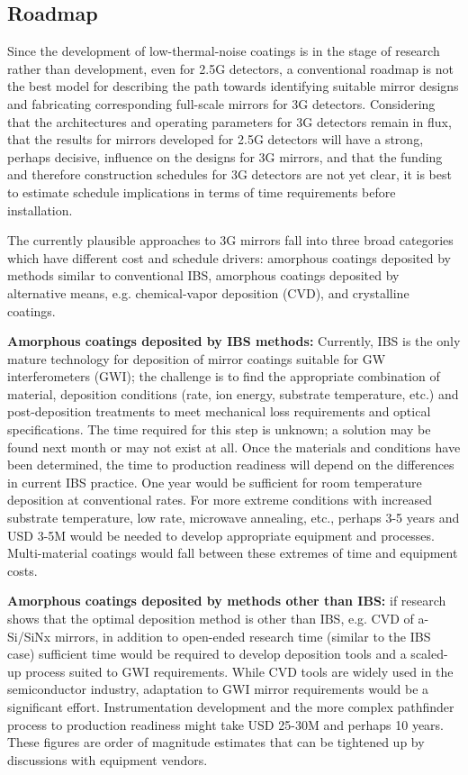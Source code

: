 \subsection{Roadmap}
Since the development of low-thermal-noise coatings is in the stage of research rather than development, even for \ac{2.5G} detectors, a conventional roadmap is not the best model for describing the path towards identifying suitable mirror designs and fabricating corresponding full-scale mirrors for \ac{3G} detectors. Considering that the architectures and operating parameters for \ac{3G} detectors remain in flux, that the results for mirrors developed for \ac{2.5G} detectors will have a strong, perhaps decisive, influence on the designs for \ac{3G} mirrors, and that the funding and therefore construction schedules for \ac{3G} detectors are not yet clear, it is best to estimate schedule implications in terms of time requirements before installation. 

The currently plausible approaches to \ac{3G} mirrors fall into three broad categories which have different cost and schedule drivers: amorphous coatings deposited by methods similar to conventional IBS, amorphous coatings deposited by alternative means, e.g. chemical-vapor deposition (CVD), and crystalline coatings. 

\textbf{Amorphous coatings deposited by IBS methods:} 
Currently, IBS is the only mature technology for deposition of mirror coatings suitable for GW interferometers (GWI); the challenge is to find the appropriate combination of material, deposition conditions (rate, ion energy, substrate temperature, etc.) and post-deposition treatments to meet mechanical loss requirements and optical specifications. The time required for this step is unknown; a solution may be found next month or may not exist at all. Once the materials and conditions have been determined, the time to production readiness will depend on the differences in current IBS practice. One year would be sufficient for room temperature deposition at conventional rates. For more extreme conditions with increased substrate temperature, low rate, microwave annealing, etc., perhaps 3-5 years and USD 3-5M would be needed to develop appropriate equipment and processes. Multi-material coatings would fall between these extremes of time and equipment costs. 

\textbf{Amorphous coatings deposited by methods other than IBS:} 
if research shows that the optimal deposition method is other than IBS, e.g. CVD of a-Si/SiNx mirrors, in addition to open-ended research time (similar to the IBS case) sufficient time would be required to develop deposition tools and a scaled-up process suited to GWI requirements. While CVD tools are widely used in the semiconductor industry, adaptation to GWI mirror requirements would be a significant effort. Instrumentation development and the more complex pathfinder process to production readiness might take USD 25-30M and perhaps 10 years. These figures are order of magnitude estimates that can be tightened up by discussions with equipment vendors. 

